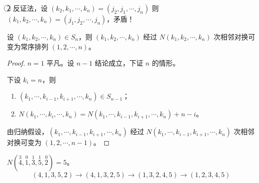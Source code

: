 \textcircled{2} 反证法，设 $(k_2,k_1,\cdots,k_n)=(j_2,j_1,\cdots,j_n)$
则 $(k_1,k_2,\cdots,k_n)=(j_1,j_2,\cdots,j_n)$，矛盾！

\begin{proposition}
设 $(k_1,k_2,\cdots,k_n)\in S_n$，则 $(k_1,k_2,\cdots,k_n)$ 经过
$N(k_1,k_2,\cdots,k_n)$ 次相邻对换可变为常序排列 $(1,2,\cdots,n)$。
\end{proposition}

\begin{proof}
$n=1$ 平凡。设 $n-1$ 结论成立，下证 $n$ 的情形。

下设 $k_i=n$，则
\begin{center}
\end{center}
\begin{enumerate}[label=\arabic*°,leftmargin=2.2em,itemsep=0.15em]
  \item $(k_1,\cdots,k_{i-1},k_{i+1},\cdots,k_n)\in S_{n-1}$；
  \item $N(k_1,\cdots,k_i,\cdots,k_n)
        =N(k_1,\cdots,k_{i-1},k_{i+1},\cdots,k_n)+n-i$。
\end{enumerate}
由归纳假设，$(k_1,\cdots,k_{i-1},k_{i+1},\cdots,k_n)$ 经过
$N(k_1,\cdots,k_{i-1},k_{i+1},\cdots,k_n)$ 次相邻对换可变为 $(1,2,\cdots,n-1)$。
\end{proof}

\begin{example}
$N(\overset{3}{4},\overset{0}{1},\overset{1}{3},\overset{1}{5},\overset{0}{2})=5$。
\[
(4,1,3,5,2)\longrightarrow(4,1,3,2,5)\longrightarrow(1,3,2,4,5)\longrightarrow(1,2,3,4,5)
\]
\end{example}

